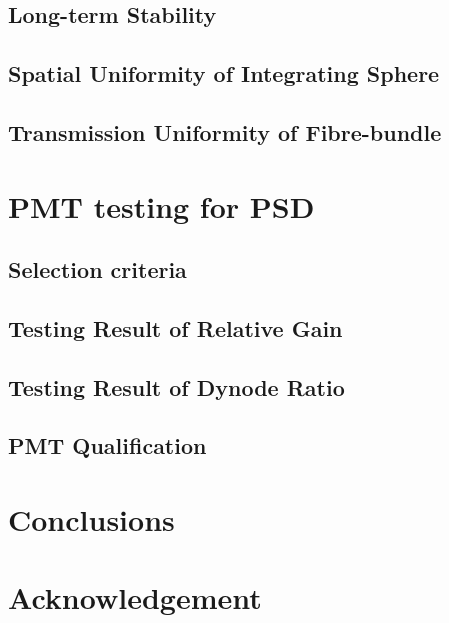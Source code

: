 \documentclass[5p, times]{elsarticle}
\begin{document}
\subsection{Long-term Stability}
\label{sec:longterm_stability}

\subsection{Spatial Uniformity of Integrating Sphere}
\label{sec:spatialuniformity_insph}

\subsection{Transmission Uniformity of Fibre-bundle}
\label{sec:transuniformity_fibre}

\section{PMT testing for PSD}
\label{sec:pmt_test}

\subsection{Selection criteria}
\label{sec:selection}

\subsection{Testing Result of Relative Gain}
\label{sec:relative_gain}

\subsection{Testing Result of Dynode Ratio}
\label{sec:dynode_ratio}

\subsection{PMT Qualification}
\label{sec:qualification}

\section{Conclusions}
\label{sec:conclustions}

\section*{Acknowledgement}
\end{document}
